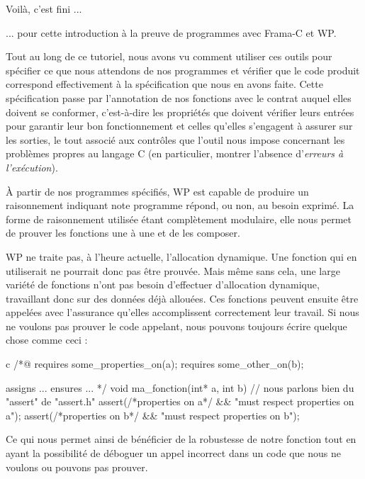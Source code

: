 \begin{Quotation}
Voilà, c'est fini ...
\end{Quotation}



... pour cette introduction à la preuve de programmes avec Frama-C et WP.



Tout au long de ce tutoriel, nous avons vu comment utiliser ces outils
pour spécifier ce que nous attendons de nos programmes et vérifier que le code
produit correspond effectivement à la spécification que nous en
avons faite. Cette spécification passe par l'annotation de nos fonctions avec
le contrat auquel elles doivent se conformer, c'est-à-dire les propriétés que
doivent vérifier leurs entrées pour garantir leur bon fonctionnement et celles
qu'elles s'engagent à assurer sur les sorties, le tout associé aux contrôles
que l'outil nous impose concernant les problèmes propres au langage C (en
particulier, montrer l'absence d'\textit{erreurs à l'exécution}).


À partir de nos programmes spécifiés, WP est capable de produire un
raisonnement indiquant note programme répond, ou non, au besoin
exprimé. La forme de raisonnement utilisée étant complètement modulaire, elle
nous permet de prouver les fonctions une à une et de les composer.


WP ne traite pas, à l'heure actuelle, l'allocation dynamique. Une fonction
qui en  utiliserait ne pourrait donc pas être prouvée. Mais même sans cela,
une large variété de fonctions n'ont pas besoin
d'effectuer d'allocation dynamique, travaillant donc sur des données déjà
allouées. Ces fonctions peuvent ensuite être appelées avec l'assurance
qu'elles accomplissent correctement leur travail. Si nous ne voulons pas prouver le
code appelant, nous pouvons toujours écrire quelque chose comme ceci :



\begin{CodeBlock}{c}
/*@
  requires some_properties_on(a);
  requires some_other_on(b);

  assigns ...
  ensures ...
*/
void ma_fonction(int* a, int b){
  // nous parlons bien du "assert" de "assert.h"
  assert(/*properties on a*/ && "must respect properties on a");
  assert(/*properties on b*/ && "must respect properties on b");
}
\end{CodeBlock}



Ce qui nous permet ainsi de bénéficier de la robustesse de notre fonction tout en
ayant la possibilité de déboguer un appel incorrect dans un code que nous ne
voulons ou pouvons pas prouver.



